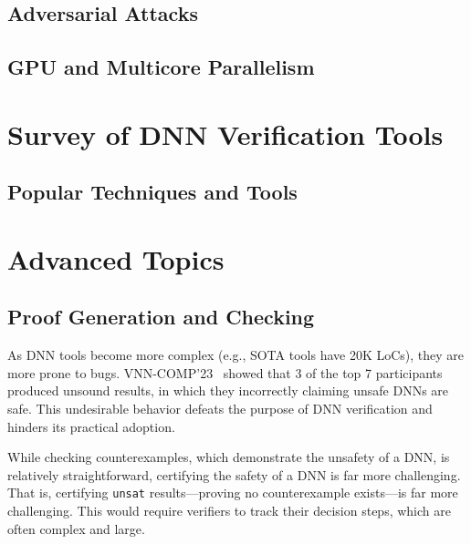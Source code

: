 \documentclass[oneside,11pt,dvipsnames]{book}
\begin{document}
\chapter{Adversarial Attacks}
\chapter{GPU and Multicore Parallelism}


\part{Survey of DNN Verification Tools}

\chapter{Popular Techniques and Tools}




\part{Advanced Topics\label{part:advanced-topics}}




\chapter{Proof Generation and Checking}\label{chapter:proof-gen-check}

As DNN tools become more complex (e.g., SOTA tools have 20K LoCs), they are more prone to bugs. VNN-COMP'23~\cite{brix2023fourth} showed that 3 of the top 7 participants produced unsound results, in which they incorrectly claiming unsafe DNNs are safe. This undesirable behavior defeats the purpose of DNN verification and hinders its practical adoption.

While checking counterexamples, which demonstrate the unsafety of a DNN, is relatively straightforward, certifying the safety of a DNN is far more challenging. That is, certifying \texttt{unsat} results---proving no counterexample exists---is far more challenging. This would require verifiers to track their decision steps, which are often complex and large. %
\end{document}
